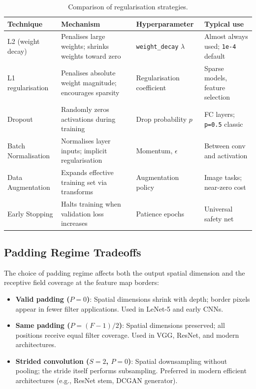 \documentclass[12pt,a4paper]{article}
\begin{document}
\begin{table}[ht]
  \centering
  \caption{Comparison of regularisation strategies.}
  \label{tab:reg_comparison}
  \begin{tabularx}{\linewidth}{@{}lXXX@{}}
    \toprule
    Technique & Mechanism & Hyperparameter & Typical use \\
    \midrule
    L2 (weight decay)
      & Penalises large weights; shrinks weights toward zero
      & \texttt{weight\_decay} $\lambda$
      & Almost always used; \texttt{1e-4} default \\
    L1 regularisation
      & Penalises absolute weight magnitude; encourages sparsity
      & Regularisation coefficient
      & Sparse models, feature selection \\
    Dropout
      & Randomly zeros activations during training
      & Drop probability $p$
      & FC layers; \texttt{p=0.5} classic \\
    Batch Normalisation
      & Normalises layer inputs; implicit regularisation
      & Momentum, $\epsilon$
      & Between conv and activation \\
    Data Augmentation
      & Expands effective training set via transforms
      & Augmentation policy
      & Image tasks; near-zero cost \\
    Early Stopping
      & Halts training when validation loss increases
      & Patience epochs
      & Universal safety net \\
    \bottomrule
  \end{tabularx}
\end{table}

\subsection{Padding Regime Tradeoffs}

\begin{keyinsight}
The choice of padding regime affects both the output spatial dimension and
the receptive field coverage at the feature map borders:
\begin{itemize}[noitemsep]
  \item \textbf{Valid padding ($P=0$)}: Spatial dimensions shrink with depth;
        border pixels appear in fewer filter applications. Used in LeNet-5
        and early CNNs.
  \item \textbf{Same padding ($P=(F{-}1)/2$)}: Spatial dimensions preserved;
        all positions receive equal filter coverage. Used in VGG, ResNet,
        and modern architectures.
  \item \textbf{Strided convolution ($S=2$, $P=0$)}: Spatial downsampling
        without pooling; the stride itself performs subsampling. Preferred in
        modern efficient architectures (e.g., ResNet stem, DCGAN generator).
\end{itemize}
\end{keyinsight}
\end{document}
